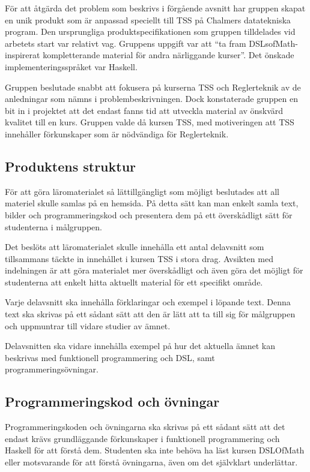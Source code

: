 \documentclass[]{article}
\begin{document}

För att åtgärda det problem som beskrivs i förgående avsnitt har gruppen skapat
en unik produkt som är anpassad speciellt till TSS på Chalmers datatekniska
program. Den ursprungliga produktspecifikationen som gruppen tilldelades vid
arbetets start var relativt vag. Gruppens uppgift var att ``ta fram
DSLsofMath-inspirerat kompletterande material för andra närliggande kurser''.
Det önskade implementeringsspråket var Haskell.

Gruppen beslutade snabbt att fokusera på kurserna TSS och Reglerteknik av de
anledningar som nämns i problembeskrivningen. Dock konstaterade gruppen en bit
in i projektet att det endast fanns tid att utveckla material av önskvärd
kvalitet till en kurs. Gruppen valde då kursen TSS, med motiveringen att
TSS innehåller förkunskaper som är nödvändiga för Reglerteknik.

\subsection{Produktens struktur}
För att göra läromaterialet så lättillgängligt som möjligt beslutades att
all materiel skulle samlas på en hemsida. På detta sätt kan man enkelt
samla text, bilder och programmeringskod och presentera dem på ett
överskådligt sätt för studenterna i målgruppen.

Det beslöts att läromaterialet skulle innehålla ett antal delavsnitt som
tillsammans täckte in innehållet i kursen TSS i stora drag.
Avsikten med indelningen är att göra materialet mer överskådligt och
även göra det möjligt för studenterna att enkelt hitta aktuellt material
för ett specifikt område.

Varje delavsnitt ska innehålla förklaringar och exempel i löpande text.
Denna text ska skrivas på ett sådant sätt att den är lätt att ta till
sig för målgruppen och uppmuntrar till vidare studier av ämnet.

Delavsnitten ska vidare innehålla exempel på hur det aktuella ämnet kan
beskrivas med funktionell programmering och DSL, samt programmeringsövningar.

\subsection{Programmeringskod och övningar}

Programmeringskoden och övningarna ska skrivas på ett sådant sätt att det endast krävs grundläggande förkunskaper i
funktionell programmering och Haskell för att förstå dem. Studenten ska inte behöva ha läst kursen DSLOfMath eller
motsvarande för att förstå övningarna, även om det självklart underlättar.
\end{document}
